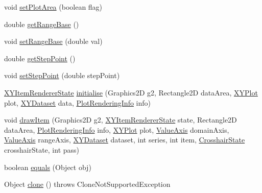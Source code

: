 \begin{DoxyCompactItemize}
void \mbox{\hyperlink{classorg_1_1jfree_1_1chart_1_1renderer_1_1xy_1_1_x_y_step_area_renderer_a03aa941046cf94fb1a298933cc3c2df8}{set\+Plot\+Area}} (boolean flag)
\item 
double \mbox{\hyperlink{classorg_1_1jfree_1_1chart_1_1renderer_1_1xy_1_1_x_y_step_area_renderer_af5930ee5f41050b92457a62b6f67be23}{get\+Range\+Base}} ()
\item 
void \mbox{\hyperlink{classorg_1_1jfree_1_1chart_1_1renderer_1_1xy_1_1_x_y_step_area_renderer_ada3dfcb79ef9abbbf17d2488e3fdfa31}{set\+Range\+Base}} (double val)
\item 
double \mbox{\hyperlink{classorg_1_1jfree_1_1chart_1_1renderer_1_1xy_1_1_x_y_step_area_renderer_adc9f95129691e8ecf98f5d589ed124d2}{get\+Step\+Point}} ()
\item 
void \mbox{\hyperlink{classorg_1_1jfree_1_1chart_1_1renderer_1_1xy_1_1_x_y_step_area_renderer_a5161326ff2e3dd9c5f43cbd50fbf8410}{set\+Step\+Point}} (double step\+Point)
\item 
\mbox{\hyperlink{classorg_1_1jfree_1_1chart_1_1renderer_1_1xy_1_1_x_y_item_renderer_state}{X\+Y\+Item\+Renderer\+State}} \mbox{\hyperlink{classorg_1_1jfree_1_1chart_1_1renderer_1_1xy_1_1_x_y_step_area_renderer_a4098efbea506563348d1bb3106ddaf78}{initialise}} (Graphics2D g2, Rectangle2D data\+Area, \mbox{\hyperlink{classorg_1_1jfree_1_1chart_1_1plot_1_1_x_y_plot}{X\+Y\+Plot}} plot, \mbox{\hyperlink{interfaceorg_1_1jfree_1_1data_1_1xy_1_1_x_y_dataset}{X\+Y\+Dataset}} data, \mbox{\hyperlink{classorg_1_1jfree_1_1chart_1_1plot_1_1_plot_rendering_info}{Plot\+Rendering\+Info}} info)
\item 
void \mbox{\hyperlink{classorg_1_1jfree_1_1chart_1_1renderer_1_1xy_1_1_x_y_step_area_renderer_aba581afbb5849df6ff26309efb30b88a}{draw\+Item}} (Graphics2D g2, \mbox{\hyperlink{classorg_1_1jfree_1_1chart_1_1renderer_1_1xy_1_1_x_y_item_renderer_state}{X\+Y\+Item\+Renderer\+State}} state, Rectangle2D data\+Area, \mbox{\hyperlink{classorg_1_1jfree_1_1chart_1_1plot_1_1_plot_rendering_info}{Plot\+Rendering\+Info}} info, \mbox{\hyperlink{classorg_1_1jfree_1_1chart_1_1plot_1_1_x_y_plot}{X\+Y\+Plot}} plot, \mbox{\hyperlink{classorg_1_1jfree_1_1chart_1_1axis_1_1_value_axis}{Value\+Axis}} domain\+Axis, \mbox{\hyperlink{classorg_1_1jfree_1_1chart_1_1axis_1_1_value_axis}{Value\+Axis}} range\+Axis, \mbox{\hyperlink{interfaceorg_1_1jfree_1_1data_1_1xy_1_1_x_y_dataset}{X\+Y\+Dataset}} dataset, int series, int item, \mbox{\hyperlink{classorg_1_1jfree_1_1chart_1_1plot_1_1_crosshair_state}{Crosshair\+State}} crosshair\+State, int pass)
\item 
boolean \mbox{\hyperlink{classorg_1_1jfree_1_1chart_1_1renderer_1_1xy_1_1_x_y_step_area_renderer_a83f08da56d872bd6e5666ddfa996b8e9}{equals}} (Object obj)
\item 
Object \mbox{\hyperlink{classorg_1_1jfree_1_1chart_1_1renderer_1_1xy_1_1_x_y_step_area_renderer_a7b9b974b75c15500e90b7e377ded10cb}{clone}} ()  throws Clone\+Not\+Supported\+Exception 
\end{DoxyCompactItemize}
